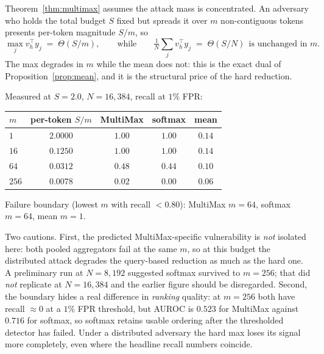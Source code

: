 \begin{remark}
\label{rem:distributed}
Theorem~\ref{thm:multimax} assumes the attack mass is concentrated. An adversary who
holds the total budget $S$ fixed but spreads it over $m$ non-contiguous tokens presents
per-token magnitude $S/m$, so
\begin{equation}
  \max_j v_h^\top y_j \;=\;\Theta(S/m),
  \qquad\text{while}\qquad
  \tfrac1N\textstyle\sum_j v_h^\top y_j \;=\;\Theta(S/N)\ \ \text{is unchanged in } m .
  \label{eq:distributed}
\end{equation}
The max degrades in $m$ while the mean does not: this is the exact dual of
Proposition~\ref{prop:mean}, and it is the structural price of the hard reduction.

Measured at $S=2.0$, $N=16{,}384$, recall at $1\%$ FPR:
\begin{center}
\begin{tabular}{lcccc}
\hline
$m$ & per-token $S/m$ & MultiMax & softmax & mean \\
\hline
$1$   & $2.0000$ & $1.00$ & $1.00$ & $0.14$\\
$16$  & $0.1250$ & $1.00$ & $1.00$ & $0.14$\\
$64$  & $0.0312$ & $0.48$ & $0.44$ & $0.10$\\
$256$ & $0.0078$ & $0.02$ & $0.00$ & $0.06$\\
\hline
\end{tabular}
\end{center}

Failure boundary (lowest $m$ with recall $<0.80$): MultiMax $m=64$, softmax $m=64$,
mean $m=1$.

Two cautions. First, the predicted MultiMax-specific vulnerability is \emph{not} isolated
here: both pooled aggregators fail at the same $m$, so at this budget the distributed
attack degrades the query-based reduction as much as the hard one. A preliminary run at
$N=8{,}192$ suggested softmax survived to $m=256$; that did \emph{not} replicate at
$N=16{,}384$ and the earlier figure should be disregarded. Second, the boundary hides a
real difference in \emph{ranking} quality: at $m=256$ both have recall $\approx 0$ at a
$1\%$ FPR threshold, but AUROC is $0.523$ for MultiMax against $0.716$ for softmax, so
softmax retains usable ordering after the thresholded detector has failed. Under a
distributed adversary the hard max loses its signal more completely, even where the
headline recall numbers coincide.
\end{remark}

